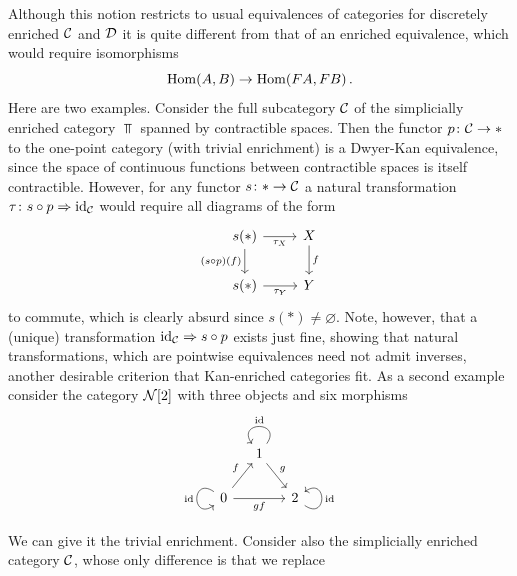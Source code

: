     Although this notion restricts to usual equivalences of categories for discretely enriched $\mathcal{C}$ and $\mathcal{D}$ it is quite different from that of an enriched equivalence, which would require isomorphisms 
    \begin{equation*}
        \operatorname{Hom}(A, B) \to \operatorname{Hom}(FA, FB) \,.
    \end{equation*}
    Here are two examples. Consider the full subcategory $\mathcal{C}$ of the simplicially enriched category $\Top$ spanned by contractible spaces. Then the functor $p \colon \mathcal{C} \to *$ to the one-point category (with trivial enrichment) is a Dwyer-Kan equivalence, since the space of continuous functions between contractible spaces is itself contractible. However, for any functor $s \colon * \to \mathcal{C}$ a natural transformation $\tau \colon s \circ p \Rightarrow \operatorname{id}_{\mathcal{C}}$ would require all diagrams of the form
    \begin{equation*}
        \begin{tikzcd}
            s(*) \arrow["\tau_X"', r] \arrow["(s \circ p)(f)"', d]
            & X \arrow["f", d] \\
            s(*) \arrow["\tau_Y"', r]
            & Y 
        \end{tikzcd}        
    \end{equation*}
    to commute, which is clearly absurd since $s(*) \neq \varnothing$. Note, however, that a (unique) transformation $\operatorname{id}_{\mathcal{C}} \Rightarrow s \circ p$ exists just fine, showing that natural transformations, which are pointwise equivalences need not admit inverses, another desirable criterion that Kan-enriched categories fit. As a second example consider the category $\mathcal{N}[2]$ with three objects and six morphisms
    \begin{equation*}
        \begin{tikzcd}[column sep=small]
                                                                                       & 1 \arrow[rd, "g"] \arrow["\id"', loop, distance=2em, in=125, out=55] &                                                      \\
0 \arrow[ru, "f"] \arrow[rr, "gf"'] \arrow["\id"', loop, distance=2em, in=215, out=145] &                                                                      & 2 \arrow["\id"', loop, distance=2em, in=35, out=325]
\end{tikzcd}
    \end{equation*}
    We can give it the trivial enrichment.
    Consider also the simplicially enriched category $\mathcal{C}$, whose only difference is that we replace 
